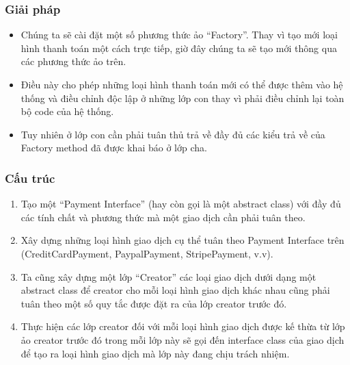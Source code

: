 \subsubsection{Giải pháp}
\begin{flushleft}

\begin{itemize}
    \item Chúng ta sẽ cài đặt một số phương thức ảo “Factory”. Thay vì tạo mới loại hình thanh toán một cách trực tiếp, giờ đây chúng ta sẽ tạo mới thông qua các phương thức ảo trên. 
    \item Điều này cho phép những loại hình thanh toán mới có thể được thêm vào hệ thống và điều chỉnh độc lập ở những lớp con thay vì phải điều chỉnh lại toàn bộ code của hệ thống. 
    \item Tuy nhiên ở lớp con cần phải tuân thủ trả về đầy đủ các kiểu trả về của Factory method đã được khai báo ở lớp cha. 
\end{itemize}

\end{flushleft}

\subsubsection{Cấu trúc}
\begin{flushleft}

    \begin{enumerate}
        \item Tạo một “Payment Interface” (hay còn gọi là một abstract class) với đầy đủ các tính chất và phương thức mà một giao dịch cần phải tuân theo. 
        \item Xây dựng những loại hình giao dịch cụ thể tuân theo Payment Interface trên (CreditCardPayment, PaypalPayment, StripePayment, v.v). 
        \item Ta cũng xây dựng một lớp “Creator” các loại giao dịch dưới dạng một abstract class để creator cho mỗi loại hình giao dịch khác nhau cũng phải tuân theo một số quy tắc được đặt ra của lớp creator trước đó. 
        \item Thực hiện các lớp creator đối với mỗi loại hình giao dịch được kế thừa từ lớp ảo creator trước đó trong mỗi lớp này sẽ gọi đến interface class của giao dịch để tạo ra loại hình giao dịch mà lớp này đang chịu trách nhiệm.

    \end{enumerate}

\end{flushleft}


